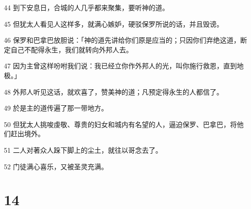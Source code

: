 \par 44 到下安息日，合城的人几乎都来聚集，要听神的道。
\par 45 但犹太人看见人这样多，就满心嫉妒，硬驳保罗所说的话，并且毁谤。
\par 46 保罗和巴拿巴放胆说：「神的道先讲给你们原是应当的；只因你们弃绝这道，断定自己不配得永生，我们就转向外邦人去。
\par 47 因为主曾这样吩咐我们说：我已经立你作外邦人的光，叫你施行救恩，直到地极。」
\par 48 外邦人听见这话，就欢喜了，赞美神的道；凡预定得永生的人都信了。
\par 49 於是主的道传遍了那一带地方。
\par 50 但犹太人挑唆虔敬、尊贵的妇女和城内有名望的人，逼迫保罗、巴拿巴，将他们赶出境外。
\par 51 二人对著众人跺下脚上的尘土，就往以哥念去了。
\par 52 门徒满心喜乐，又被圣灵充满。

\chapter{14}

